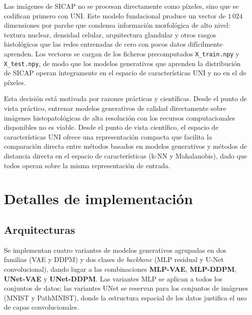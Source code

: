 Las imágenes de SICAP no se procesan directamente como píxeles, sino que se codifican
primero con UNI. Este modelo fundacional produce un vector
de $1\,024$ dimensiones por parche que condensa información morfológica de alto nivel:
textura nuclear, densidad celular, arquitectura glandular y otros rasgos histológicos que
las redes entrenadas de cero con pocos datos difícilmente aprenden. Los vectores se
cargan de los ficheros precomputados \texttt{X\_train.npy} y \texttt{X\_test.npy}, de
modo que los modelos generativos que aprenden la distribución de SICAP operan íntegramente en el espacio de
características UNI y no en el de píxeles.

Esta decisión está motivada por razones prácticas y científicas. Desde el punto de
vista práctico, entrenar modelos generativos de calidad directamente sobre imágenes
histopatológicas de alta resolución con los recursos computacionales disponibles no
es viable. Desde el punto de vista científico, el espacio de características UNI
ofrece una representación compacta que facilita la comparación directa entre métodos
basados en modelos generativos y métodos de distancia directa en el espacio de
características (k-NN y Mahalanobis), dado que todos operan sobre la misma
representación de entrada.

\section{Detalles de implementación}
\label{sec:exp-distancia}

\subsection{Arquitecturas}
\label{subsec:arquitecturas}

Se implementan cuatro variantes de modelos generativos agrupadas en dos familias
(VAE y DDPM) y dos clases de \textit{backbone} (MLP residual y U-Net convolucional),
dando lugar a las combinaciones \textbf{MLP-VAE}, \textbf{MLP-DDPM}, \textbf{UNet-VAE}
y \textbf{UNet-DDPM}. Las variantes MLP se aplican a todos los conjuntos de datos;
las variantes UNet se reservan para los conjuntos de imágenes (MNIST y PathMNIST),
donde la estructura espacial de los datos justifica el uso de capas convolucionales.

